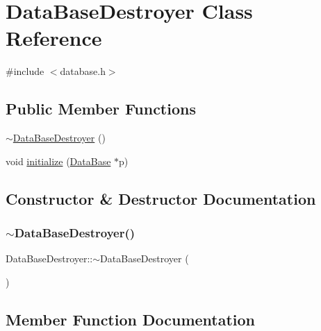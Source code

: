 \hypertarget{class_data_base_destroyer}{}\section{Data\+Base\+Destroyer Class Reference}
\label{class_data_base_destroyer}


{\ttfamily \#include $<$database.\+h$>$}

\subsection*{Public Member Functions}
\begin{DoxyCompactItemize}
\item 
\mbox{\hyperlink{class_data_base_destroyer_a2be0488f65d1495e0e303efb01013e62}{$\sim$\+Data\+Base\+Destroyer}} ()
\item 
void \mbox{\hyperlink{class_data_base_destroyer_aee85b804dca5015f185f2c1b47d85aa3}{initialize}} (\mbox{\hyperlink{class_data_base}{Data\+Base}} $\ast$p)
\end{DoxyCompactItemize}


\subsection{Constructor \& Destructor Documentation}
\mbox{\label{class_data_base_destroyer_a2be0488f65d1495e0e303efb01013e62}} 
\subsubsection{\texorpdfstring{$\sim$\+Data\+Base\+Destroyer()}{~DataBaseDestroyer()}}
{\footnotesize\ttfamily Data\+Base\+Destroyer\+::$\sim$\+Data\+Base\+Destroyer (\begin{DoxyParamCaption}{ }\end{DoxyParamCaption})\hspace{0.3cm}{\ttfamily [inline]}}



\subsection{Member Function Documentation}
\mbox{\label{class_data_base_destroyer_aee85b804dca5015f185f2c1b47d85aa3}} 
